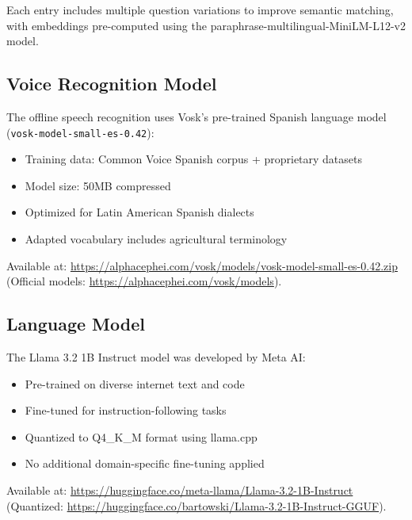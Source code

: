 \documentclass[11pt,a4paper]{article}
\begin{document}
Each entry includes multiple question variations to improve semantic matching, with embeddings pre-computed using the paraphrase-multilingual-MiniLM-L12-v2 model.

\subsection{Voice Recognition Model}

The offline speech recognition uses Vosk's pre-trained Spanish language model (\texttt{vosk-model-small-es-0.42}):
\begin{itemize}
    \item Training data: Common Voice Spanish corpus + proprietary datasets
    \item Model size: 50MB compressed
    \item Optimized for Latin American Spanish dialects
    \item Adapted vocabulary includes agricultural terminology
\end{itemize}
Available at: \url{https://alphacephei.com/vosk/models/vosk-model-small-es-0.42.zip} (Official models: \url{https://alphacephei.com/vosk/models}).

\subsection{Language Model}

The Llama 3.2 1B Instruct model was developed by Meta AI:
\begin{itemize}
    \item Pre-trained on diverse internet text and code
    \item Fine-tuned for instruction-following tasks
    \item Quantized to Q4\_K\_M format using llama.cpp
    \item No additional domain-specific fine-tuning applied
\end{itemize}
Available at: \url{https://huggingface.co/meta-llama/Llama-3.2-1B-Instruct} (Quantized: \url{https://huggingface.co/bartowski/Llama-3.2-1B-Instruct-GGUF}).
\end{document}
